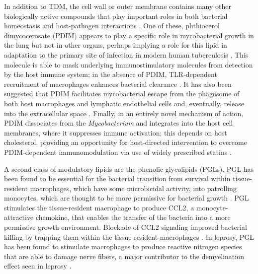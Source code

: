 In addition to TDM, the cell wall or outer membrane contains many other biologically active compounds that play important roles in both bacterial homeostasis and host\hyp{}pathogen interactions \citep{Yu2012, Alderwick2015, Rens2021}. One of these, phthiocerol dimycocerosate (PDIM) appears to play a specific role in mycobacterial growth in the lung but not in other organs, perhaps implying a role for this lipid in adaptation to the primary site of infection in modern human tuberculosis \citep{Cox1999}. This molecule is able to mask underlying immunostimulatory molecules from detection by the host immune system; in the absence of PDIM, TLR\hyp{}dependent recruitment of macrophages enhances bacterial clearance \citep{Cambier2014b, Day2014}. It has also been suggested that PDIM facilitates mycobacterial escape from the phagosome of both host macrophages and lymphatic endothelial cells and, eventually, release into the extracellular space \citep{Quigley2017, Lerner2018}. Finally, in an entirely novel mechanism of action, PDIM dissociates from the \textit{Mycobacterium} and integrates into the host cell membranes, where it suppresses immune activation; this depends on host cholesterol, providing an opportunity for host\hyp{}directed intervention to overcome PDIM\hyp{}dependent immunomodulation via use of widely prescribed statins \citep{Cambier2020}.

A second class of modulatory lipids are the phenolic glycolipids (PGLs). PGL has been found to be essential for the bacterial transition from survival within tissue\hyp{}resident macrophages, which have some microbicidal activity, into patrolling monocytes, which are thought to be more permissive for bacterial growth \citep{Barnes2017, Sinsimer2008}. PGL stimulates the tissue\hyp{}resident macrophage to produce CCL2, a monocyte\hyp{}attractive chemokine, that enables the transfer of the bacteria into a more permissive growth environment. Blockade of CCL2 signaling improved bacterial killing by trapping them within the tissue\hyp{}resident macrophages \citep{Cambier2014b, Cambier2017}. In leprosy, PGL has been found to stimulate macrophages to produce reactive nitrogen species that are able to damage nerve fibers, a major contributor to the demyelination effect seen in leprosy \citep{Madigan2017}.

